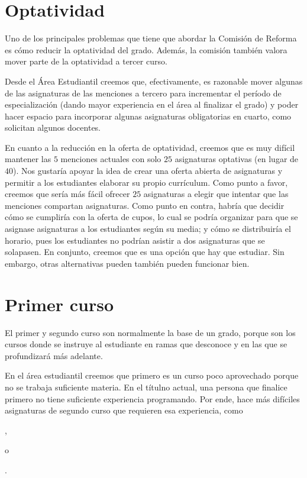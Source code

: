 
\section{Optatividad}

Uno de los principales problemas que tiene que abordar
la Comisión de Reforma
es cómo reducir la optatividad del grado. %
Además, la comisión también valora mover parte de la optatividad a tercer curso.

Desde el Área Estudiantil creemos que, efectivamente,
es razonable mover algunas de las asignaturas de las menciones a tercero para
incrementar el período de especialización
(dando mayor experiencia en el área al finalizar el grado)
y poder hacer espacio para
incorporar algunas asignaturas obligatorias en cuarto,
como solicitan algunos docentes.

En cuanto a la reducción en la oferta de optatividad,
creemos que es muy difícil mantener las $5$ menciones actuales
con solo $25$ asignaturas optativas (en lugar de $40$).
Nos gustaría apoyar la idea de crear una oferta abierta de asignaturas
y permitir a los estudiantes elaborar su propio currículum.
Como punto a favor, creemos que
sería más fácil ofrecer $25$ asignaturas a elegir
que intentar que las menciones compartan asignaturas.
Como punto en contra, habría que decidir
cómo se cumpliría con la oferta de cupos,
lo cual se podría organizar para que
se asignase asignaturas a los estudiantes según su media;
y cómo se distribuiría el horario,
pues los estudiantes no podrían asistir a dos asignaturas que se solapasen.
En conjunto, creemos que es una opción que hay que estudiar.
Sin embargo, otras alternativas pueden también pueden funcionar bien.

\section{Primer curso}

El primer y segundo curso son normalmente la base de un grado,
porque son los cursos donde se instruye al estudiante en ramas que desconoce y
en las que se profundizará más adelante.

En el área estudiantil creemos que primero es un curso poco aprovechado
porque no se trabaja suficiente materia.
En el títulno actual, una persona que finalice primero
no tiene suficiente experiencia programando.
Por ende, hace más difíciles asignaturas de segundo curso
que requieren esa experiencia, como
\subject{Algoritmos y Estructuras de Datos},
\subject{Programación Orientada a Objetos} o
\subject{Programación Concurrente y Distribuida}.

